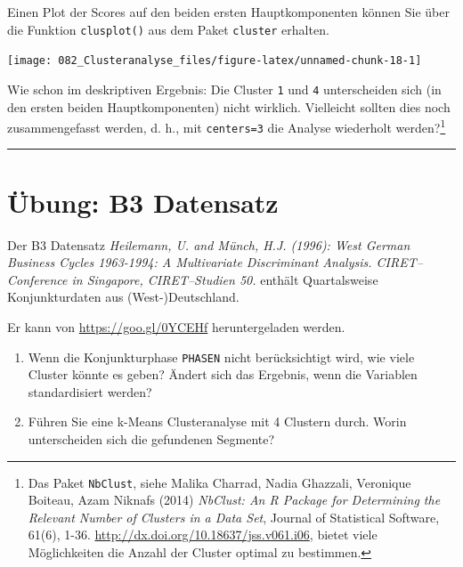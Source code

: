 \documentclass[12pt,]{book}
\newenvironment{Shaded}{\begin{snugshade}}{\end{snugshade}}
\newcommand{\KeywordTok}[1]{\textcolor[rgb]{0.13,0.29,0.53}{\textbf{{#1}}}}
\newcommand{\DataTypeTok}[1]{\textcolor[rgb]{0.13,0.29,0.53}{{#1}}}
\newcommand{\DecValTok}[1]{\textcolor[rgb]{0.00,0.00,0.81}{{#1}}}
\newcommand{\OtherTok}[1]{\textcolor[rgb]{0.56,0.35,0.01}{{#1}}}
\newcommand{\NormalTok}[1]{{#1}}
\providecommand{\tightlist}{%
  \setlength{\itemsep}{0pt}\setlength{\parskip}{0pt}}
\let\rmarkdownfootnote\footnote%
\def\footnote{\protect\rmarkdownfootnote}
\begin{document}
Einen Plot der Scores auf den beiden ersten Hauptkomponenten können Sie
über die Funktion \texttt{clusplot()} aus dem Paket \texttt{cluster}
erhalten.

\begin{Shaded}
\end{Shaded}

\begin{center}\texttt{[image: 082\_Clusteranalyse\_files/figure-latex/unnamed-chunk-18-1]} \end{center}

Wie schon im deskriptiven Ergebnis: Die Cluster \texttt{1} und
\texttt{4} unterscheiden sich (in den ersten beiden Hauptkomponenten)
nicht wirklich. Vielleicht sollten dies noch zusammengefasst werden, d.
h., mit \texttt{centers=3} die Analyse wiederholt werden?\footnote{Das
  Paket \texttt{NbClust}, siehe Malika Charrad, Nadia Ghazzali,
  Veronique Boiteau, Azam Niknafs (2014) \emph{NbClust: An R Package for
  Determining the Relevant Number of Clusters in a Data Set}, Journal of
  Statistical Software, 61(6), 1-36.
  \url{http://dx.doi.org/10.18637/jss.v061.i06}, bietet viele
  Möglichkeiten die Anzahl der Cluster optimal zu bestimmen.}

\begin{center}\rule{0.5\linewidth}{\linethickness}\end{center}

\section{Übung: B3 Datensatz}\label{ubung-b3-datensatz}

Der B3 Datensatz \emph{Heilemann, U. and Münch, H.J. (1996): West German
Business Cycles 1963-1994: A Multivariate Discriminant Analysis.
CIRET--Conference in Singapore, CIRET--Studien 50.} enthält
Quartalsweise Konjunkturdaten aus (West-)Deutschland.

Er kann von \url{https://goo.gl/0YCEHf} heruntergeladen werden.

\begin{enumerate}
\def\labelenumi{\arabic{enumi}.}
\tightlist
\item
  Wenn die Konjunkturphase \texttt{PHASEN} nicht berücksichtigt wird,
  wie viele Cluster könnte es geben? Ändert sich das Ergebnis, wenn die
  Variablen standardisiert werden?
\item
  Führen Sie eine k-Means Clusteranalyse mit 4 Clustern durch. Worin
  unterscheiden sich die gefundenen Segmente?
\end{enumerate}
\end{document}
